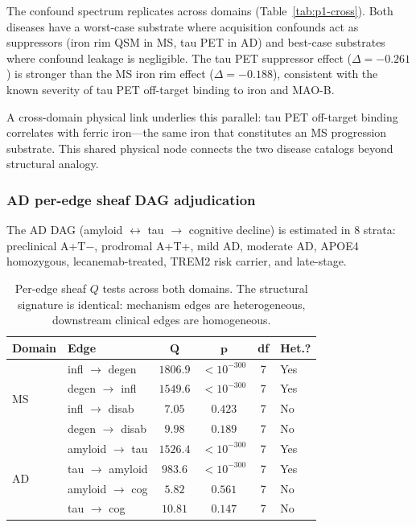 \documentclass{article}
\begin{document}
The confound spectrum replicates across domains (Table~\ref{tab:p1-cross}).
Both diseases have a worst-case substrate where acquisition confounds act as suppressors (iron rim QSM in MS, tau PET in AD) and best-case substrates where confound leakage is negligible.
The tau PET suppressor effect ($\Delta = -0.261$) is stronger than the MS iron rim effect ($\Delta = -0.188$), consistent with the known severity of tau PET off-target binding to iron and MAO-B.

A cross-domain physical link underlies this parallel: tau PET off-target binding correlates with ferric iron---the same iron that constitutes an MS progression substrate.
This shared physical node connects the two disease catalogs beyond structural analogy.

\subsubsection{AD per-edge sheaf DAG adjudication}

The AD DAG (amyloid $\leftrightarrow$ tau $\to$ cognitive decline) is estimated in 8 strata: preclinical A+T$-$, prodromal A+T+, mild AD, moderate AD, APOE4 homozygous, lecanemab-treated, TREM2 risk carrier, and late-stage.

\begin{table}[t]
\centering
\caption{Per-edge sheaf $Q$ tests across both domains. The structural signature is identical: mechanism edges are heterogeneous, downstream clinical edges are homogeneous.}
\label{tab:dag-cross}
\small
\begin{tabular}{@{}llcccl@{}}
\toprule
\textbf{Domain} & \textbf{Edge} & $\boldsymbol{Q}$ & $\boldsymbol{p}$ & \textbf{df} & \textbf{Het.?} \\
\midrule
\multirow{4}{*}{MS} & infl $\to$ degen & $1806.9$ & $< 10^{-300}$ & 7 & Yes \\
& degen $\to$ infl & $1549.6$ & $< 10^{-300}$ & 7 & Yes \\
& infl $\to$ disab & $7.05$ & $0.423$ & 7 & No \\
& degen $\to$ disab & $9.98$ & $0.189$ & 7 & No \\
\midrule
\multirow{4}{*}{AD} & amyloid $\to$ tau & $1526.4$ & $< 10^{-300}$ & 7 & Yes \\
& tau $\to$ amyloid & $983.6$ & $< 10^{-300}$ & 7 & Yes \\
& amyloid $\to$ cog & $5.82$ & $0.561$ & 7 & No \\
& tau $\to$ cog & $10.81$ & $0.147$ & 7 & No \\
\bottomrule
\end{tabular}
\end{table}
\end{document}
